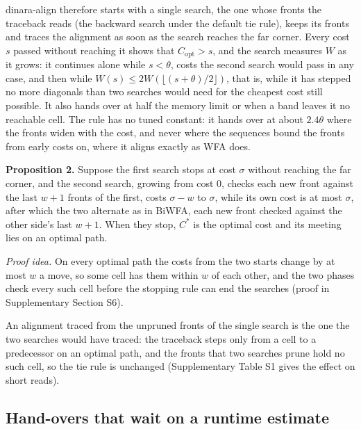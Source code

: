 dinara-align therefore starts with a single search, the one whose fronts the traceback reads (the backward search under the default tie rule), keeps its fronts and traces the alignment as soon as the search reaches the far corner. Every cost \(s\) passed without reaching it shows that \(C_{\mathrm{opt}} > s\), and the search measures \(W\) as it grows: it continues alone while \(s < \theta\), costs the second search would pass in any case, and then while \(W(s) \le 2W(\lfloor (s+\theta)/2 \rfloor)\), that is, while it has stepped no more diagonals than two searches would need for the cheapest cost still possible. It also hands over at half the memory limit or when a band leaves it no reachable cell. The rule has no tuned constant: it hands over at about \(2.4\theta\) where the fronts widen with the cost, and never where the sequences bound the fronts from early costs on, where it aligns exactly as WFA does.

\textbf{Proposition 2.} Suppose the first search stops at cost \(\sigma\) without reaching the far corner, and the second search, growing from cost 0, checks each new front against the last \(w+1\) fronts of the first, costs \(\sigma-w\) to \(\sigma\), while its own cost is at most \(\sigma\), after which the two alternate as in BiWFA, each new front checked against the other side's last \(w+1\). When they stop, \(C^*\) is the optimal cost and its meeting lies on an optimal path.

\emph{Proof idea.} On every optimal path the costs from the two starts change by at most \(w\) a move, so some cell has them within \(w\) of each other, and the two phases check every such cell before the stopping rule can end the searches (proof in Supplementary Section S6).

An alignment traced from the unpruned fronts of the single search is the one the two searches would have traced: the traceback steps only from a cell to a predecessor on an optimal path, and the fronts that two searches prune hold no such cell, so the tie rule is unchanged (Supplementary Table S1 gives the effect on short reads).

\subsection{Hand-overs that wait on a runtime estimate}

